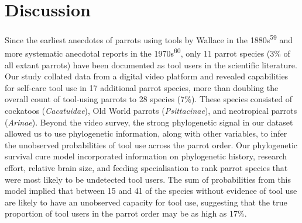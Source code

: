 \documentclass[
  man, donotrepeattitle,floatsintext]{apa6}
\begin{document}
\hypertarget{discussion}{%
\section{Discussion}\label{discussion}}

Since the earliest anecdotes of parrots using tools by Wallace in the 1880s\textsuperscript{59} and more systematic anecdotal reports in the 1970s\textsuperscript{60},
only 11 parrot species (3\% of all extant parrots) have been documented as tool
users in the scientific literature. Our study collated data from a digital video
platform and revealed capabilities for self-care tool use in 17 additional
parrot species, more than doubling the overall count of tool-using parrots to
28 species (7\%). These species consisted of cockatoos (\emph{Cacatuidae}), Old World
parrots (\emph{Psittacinae}), and neotropical parrots (\emph{Arinae}). Beyond the video
survey, the strong phylogenetic signal in our dataset allowed us to use
phylogenetic information, along with other variables, to infer the unobserved
probabilities of tool use across the parrot order. Our phylogenetic survival
cure model incorporated information on phylogenetic history, research effort,
relative brain size, and feeding specialisation to rank parrot species that were
most likely to be undetected tool users. The sum of probabilities from this
model implied that between 15 and 41 of the species without evidence of tool use
are likely to have an unobserved capacity for tool use, suggesting that the true
proportion of tool users in the parrot order may be as high as 17\%.
\end{document}
